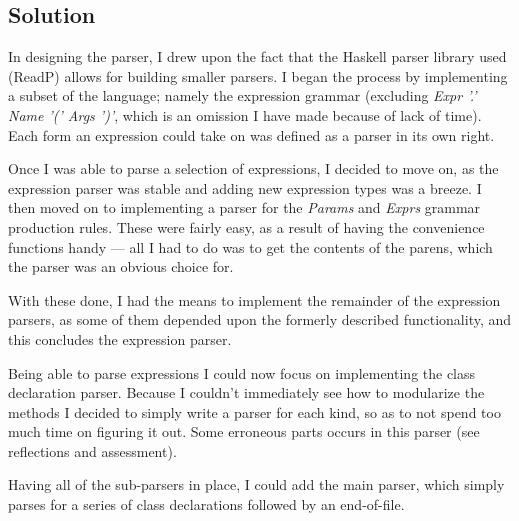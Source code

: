 %
%


\subsection{Solution}
In designing the parser, I drew upon the fact that the Haskell parser library
used (ReadP) allows for building smaller parsers. I began the process by
implementing a subset of the language; namely the expression grammar
(excluding {\it Expr '.' Name '(' Args ')'}, which is an omission I have made
because of lack of time). Each form an expression could take on was defined as
a parser in its own right.

Once I was able to parse a selection of expressions, I decided to move on, as
the expression parser was stable and adding new expression types was a breeze.
I then moved on to implementing a parser for the {\it Params} and {\it Exprs}
grammar production rules. These were fairly easy, as a result of having the
convenience functions handy --- all I had to do was to get the contents of the
parens, which the  parser was an obvious choice for.

With these done, I had the means to implement the remainder of the expression
parsers, as some of them depended upon the formerly described functionality,
and this concludes the expression parser.

Being able to parse expressions I could now focus on implementing the class
declaration parser. Because I couldn't immediately see how to modularize the
methods I decided to simply write a parser for each kind, so as to not spend
too much time on figuring it out. Some erroneous parts occurs in this parser
(see reflections and assessment).

Having all of the sub-parsers in place, I could add the main parser, which
simply parses for a series of class declarations followed by an end-of-file.

